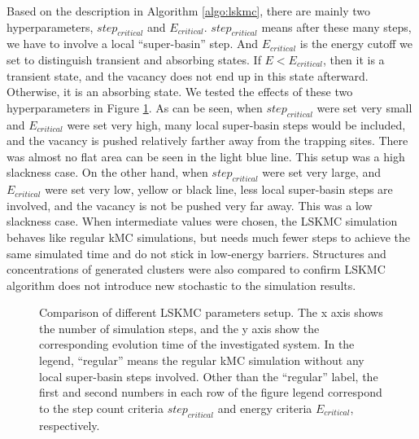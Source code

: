 Based on the description in Algorithm \ref{algo:lskmc}, there are mainly two hyperparameters, $step_{critical}$ and $E_{critical}$. $step_{critical}$ means after these many steps, we have to involve a local ``super-basin'' step. And $E_{critical}$ is the energy cutoff we set to distinguish transient and absorbing states. If $E < E_{critical}$, then it is a transient state, and the vacancy does not end up in this state afterward. Otherwise, it is an absorbing state. We tested the effects of these two hyperparameters in Figure \ref{Chap:Al/Vac:fig:lskmc_time}. As can be seen, when $step_{critical}$ were set very small and $E_{critical}$ were set very high, many local super-basin steps would be included, and the vacancy is pushed relatively farther away from the trapping sites. There was almost no flat area can be seen in the light blue line. This setup was a high slackness case. On the other hand, when $step_{critical}$ were set very large, and $E_{critical}$ were set very low, yellow or black line, less local super-basin steps are involved, and the vacancy is not be pushed very far away. This was a low slackness case. When intermediate values were chosen, the \ac{LSKMC} simulation behaves like regular \ac{kMC} simulations, but needs much fewer steps to achieve the same simulated time and do not stick in low-energy barriers.  Structures and concentrations of generated clusters were also compared to confirm \ac{LSKMC} algorithm does not introduce new stochastic to the simulation results.

\begingroup
\begin{figure}[!ht]
  \centering
\caption[Comparison of different \acf{LSKMC} parameters setup.]{Comparison of different \ac{LSKMC} parameters setup. The x axis shows the number of simulation steps, and the y axis show the corresponding evolution time of the investigated system. In the legend, ``regular'' means the regular \ac{kMC} simulation without any local super-basin steps involved. Other than the ``regular'' label, the first and second numbers in each row of the figure legend correspond to the step count criteria $step_{critical}$ and energy criteria $E_{critical}$, respectively.}
\label{Chap:Al/Vac:fig:lskmc_time}
\end{figure}
\endgroup


